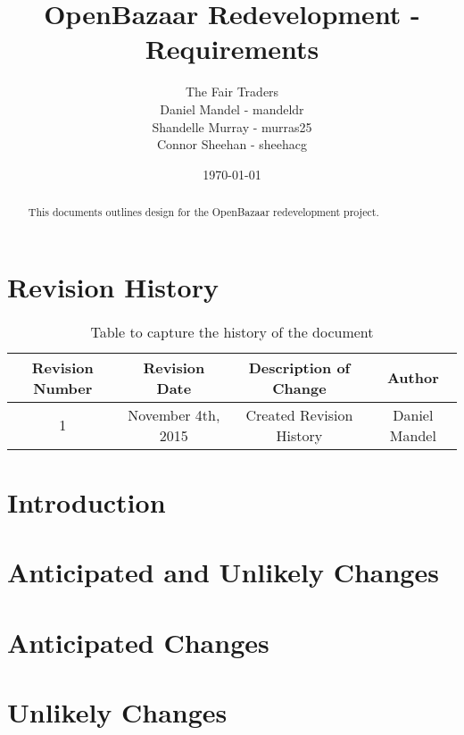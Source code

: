\documentclass{article}
\begin{document}
\title{OpenBazaar Redevelopment - Requirements}
\author{The Fair Traders \\ Daniel Mandel - mandeldr \\ Shandelle Murray - murras25 \\ Connor Sheehan - sheehacg}
\date{\today}
\maketitle

\begin{abstract}
This documents outlines design for the OpenBazaar redevelopment project.
\end{abstract}

\newpage

\tableofcontents

\section*{Revision History}

\begin{table}[h!]
\centering
\begin{tabular}{||c c c c||}
 \hline
 Revision Number & Revision Date & Description of Change & Author \\ [0.5ex]
 \hline\hline
 1 & November 4th, 2015 & Created Revision History & Daniel Mandel \\ [1ex]
 \hline
\end{tabular}
\caption{Table to capture the history of the document}
\label{table:1}
\end{table}

\section*{Introduction}

\section*{Anticipated and Unlikely Changes}

\section{Anticipated Changes}
\section{Unlikely Changes}
\end{document}
